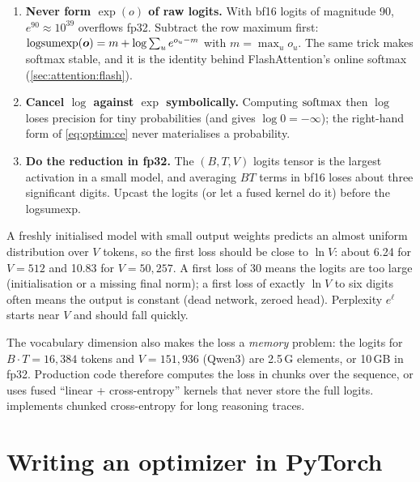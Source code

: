 \begin{enumerate}
  \item \textbf{Never form $\exp(o)$ of raw logits.} With bf16 logits of magnitude 90,
        $e^{90}\approx 10^{39}$ overflows fp32. Subtract the row maximum first:
        $\operatorname{logsumexp}(\bm{o}) = m + \log\sum_u e^{o_u - m}$ with $m=\max_u o_u$.
        The same trick makes softmax stable, and it is the identity behind FlashAttention's
        online softmax (\cref{sec:attention:flash}).
  \item \textbf{Cancel $\log$ against $\exp$ symbolically.} Computing $\operatorname{softmax}$ then $\log$
        loses precision for tiny probabilities (and gives $\log 0=-\infty$); the right-hand form of
        \cref{eq:optim:ce} never materialises a probability.
  \item \textbf{Do the reduction in fp32.} The $(B,T,V)$ logits tensor is the largest activation
        in a small model, and averaging $BT$ terms in bf16 loses about three significant digits.
        Upcast the logits (or let a fused kernel do it) before the logsumexp.
\end{enumerate}

\begin{keyidea}
A freshly initialised model with small output weights predicts an almost uniform distribution
over $V$ tokens, so the first loss should be close to $\ln V$: about 6.24 for $V=512$ and
10.83 for $V=50{,}257$. A first loss of 30 means the logits are too large (initialisation or a
missing final norm); a first loss of exactly $\ln V$ to six digits often means the output is
constant (dead network, zeroed head). Perplexity $e^{\ell}$ starts near $V$ and should fall
quickly.
\end{keyidea}

The vocabulary dimension also makes the loss a \emph{memory} problem: the logits for
$B\cdot T=16{,}384$ tokens and $V=151{,}936$ (Qwen3) are 2.5\,G elements, or 10\,GB in fp32.
Production code therefore computes the loss in chunks over the sequence, or uses fused
``linear + cross-entropy'' kernels that never store the full logits.  implements
chunked cross-entropy for long reasoning traces.

\section{Writing an optimizer in PyTorch}\label{sec:optim:api}

